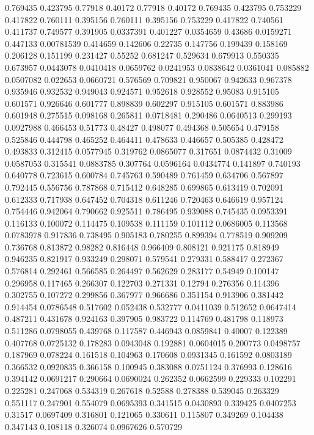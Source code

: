 0.769435 0.423795
0.77918 0.40172
0.77918 0.40172
0.769435 0.423795
0.753229 0.417822
0.760111 0.395156
0.760111 0.395156
0.753229 0.417822
0.740561 0.411737
0.749577 0.391905
0.0337391 0.401227
0.0354659 0.43686
0.0159271 0.447133
0.00781539 0.414659
0.142606 0.22735
0.147756 0.199439
0.158169 0.206128
0.151199 0.231427
0.55252 0.681247
0.529634 0.679913
0.550335 0.673957
0.0443078 0.0410418
0.0659762 0.0241953
0.0838642 0.0361041
0.085882 0.0507082
0.022653 0.0660721
0.576569 0.709821
0.950067 0.942633
0.967378 0.935946
0.932532 0.949043
0.924571 0.952618
0.928552 0.95083
0.915105 0.601571
0.926646 0.601777
0.898839 0.602297
0.915105 0.601571
0.883986 0.601948
0.275515 0.098168
0.265811 0.0718481
0.290486 0.0640513
0.299193 0.0927988
0.466453 0.51773
0.48427 0.498077
0.494368 0.505654
0.479158 0.525846
0.444798 0.465252
0.464411 0.478633
0.446657 0.505385
0.428472 0.493833
0.312415 0.0577945
0.319762 0.0865077
0.317651 0.0874432
0.31009 0.0587053
0.315541 0.0883785
0.307764 0.0596164
0.0434774 0.141897
0.740193 0.640778
0.723615 0.600784
0.745763 0.590489
0.761459 0.634706
0.567897 0.792445
0.556756 0.787868
0.715412 0.648285
0.699865 0.613419
0.702091 0.612333
0.717938 0.647452
0.704318 0.611246
0.720463 0.646619
0.957124 0.754446
0.942064 0.790662
0.925511 0.786495
0.939088 0.745435
0.0953391 0.116133
0.100072 0.114475
0.109538 0.111159
0.101112 0.0686005
0.113568 0.0783978
0.917836 0.738495
0.905183 0.780255
0.899394 0.778519
0.909209 0.736768
0.813872 0.98282
0.816448 0.966409
0.808121 0.921175
0.818949 0.946235
0.821917 0.933249
0.298071 0.579541
0.279331 0.588417
0.272367 0.576814
0.292461 0.566585
0.264497 0.562629
0.283177 0.54949
0.100147 0.296958
0.117465 0.266307
0.122703 0.271331
0.12794 0.276356
0.114396 0.302755
0.107272 0.299856
0.367977 0.966686
0.351154 0.913906
0.381442 0.914454
0.0786548 0.517602
0.052438 0.532777
0.0411039 0.512652
0.0647414 0.487211
0.431678 0.924163
0.397905 0.983722
0.114769 0.481798
0.118973 0.511286
0.0798055 0.439768
0.117587 0.446943
0.0859841 0.40007
0.122389 0.407768
0.0725132 0.178283
0.0943048 0.192881
0.0604015 0.200773
0.0498757 0.187969
0.078224 0.161518
0.104963 0.170608
0.0931345 0.161592
0.0803189 0.366532
0.0920835 0.366158
0.100945 0.383088
0.0751124 0.376993
0.128616 0.394142
0.0691217 0.290664
0.0690024 0.262352
0.0662599 0.229333
0.102291 0.225281
0.247068 0.534319
0.267618 0.52588
0.278388 0.539045
0.263329 0.551117
0.247901 0.554079
0.0695393 0.341515
0.0430893 0.339425
0.0407253 0.31517
0.0697409 0.316801
0.121065 0.330611
0.115807 0.349269
0.104438 0.347143
0.108118 0.326074
0.0967626 0.570729
